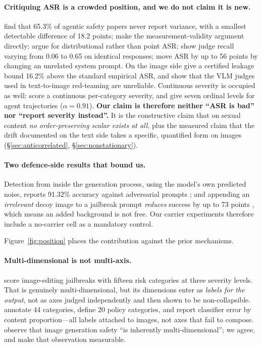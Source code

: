 \documentclass[11pt]{article}
\begin{document}
\paragraph{Critiquing ASR is a crowded position, and we do not claim it is new.}
\citet{asrisnotanumber} find that 65.3\% of agentic safety papers never report
variance, with a smallest detectable difference of 18.2 points;
\citet{comparisonrequires} make the measurement-validity argument directly;
\citet{singleconfig} argue for distributional rather than point ASR;
\citet{judgecalib} show judge recall varying from 0.06 to 0.65 on identical
responses; \citet{operationalstates} move ASR by up to 56 points by changing an
unrelated system prompt. On the image side \citet{certifyingunlearning} give a
certified leakage bound 16.2\% above the standard empirical ASR, and
\citet{rise} show that the VLM judges used in text-to-image red-teaming are
unreliable. Continuous severity is occupied as well: \citet{past2harm} score a
continuous per-category severity, and \citet{actiongraded} give seven ordinal
levels for agent trajectories ($\alpha=0.91$). \textbf{Our claim is therefore
neither ``ASR is bad'' nor ``report severity instead''.} It is the constructive
claim that on sexual content \emph{no order-preserving scalar exists at all},
plus the measured claim that the drift documented on the text side takes a
specific, quantified form on images (\S\ref{sec:anticorrelated},
\S\ref{sec:nonstationary}).

\paragraph{Two defence-side results that bound us.} Detection from inside the
generation process, using the model's own predicted noise, reports 91.32\%
accuracy against adversarial prompts \citep{igndetector,unindm}; and appending
an \emph{irrelevant} decoy image to a jailbreak prompt \emph{reduces} success by
up to 73 points \citep{decoydrops}, which means an added background is not free.
Our carrier experiments therefore include a no-carrier cell as a mandatory
control.

Figure~\ref{fig:position} places the contribution against the prior mechanisms. \paragraph{Multi-dimensional is not multi-axis.} \citet{visualjailbreak} score
image-editing jailbreaks with fifteen risk categories at three severity levels.
That is genuinely multi-dimensional, but its dimensions enter as
\emph{labels for the output}, not as axes judged independently and then shown
to be non-collapsible. \citet{t2isafety} annotate 44 categories,
\citet{t2irisky} define 20 policy categories, and \citet{redteamingnsfw}
report classifier error by content proportion---all labels attached to images,
not axes that fail to compose. \citet{safetyreport} observe that image
generation safety ``is inherently multi-dimensional''; we agree, and make that
observation measurable.
\end{document}
